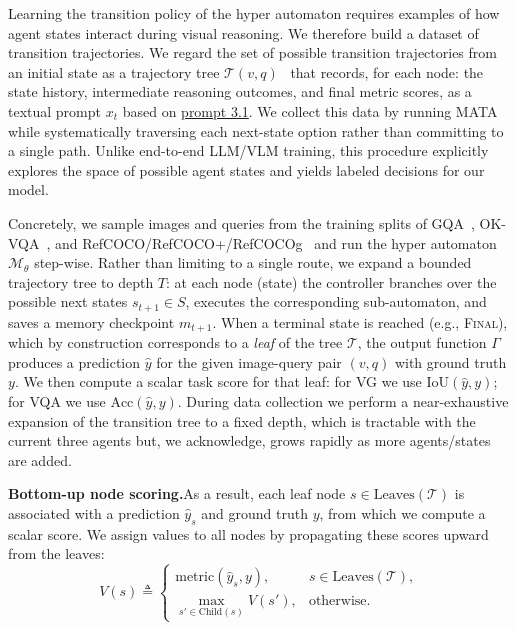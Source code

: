 \documentclass{article} %
\newcommand{\methodname}{MATA}
\begin{document}
Learning the transition policy of the hyper automaton requires examples of how agent states interact during visual reasoning. We therefore build a dataset of transition trajectories. We regard the set of possible transition trajectories from an initial state as a trajectory tree $\mathcal{T}(v,q)$~\citep{kearns_sparse_2002} that records, for each node: the state history, intermediate reasoning outcomes, and final metric scores, as a textual prompt $x_t$ based on \hyperref[prompt:hyper_agent]{prompt 3.1}. We collect this data by running \methodname{} while systematically traversing each next-state option rather than committing to a single path. Unlike end-to-end LLM/VLM training, this procedure explicitly explores the space of possible agent states and yields labeled decisions for our model.

Concretely, we sample images and queries from the training splits of GQA~\citep{hudson_gqa_2019}, OK-VQA~\citep{marino_ok-vqa_2019}, and RefCOCO/RefCOCO+/RefCOCOg~\citep{kazemzadeh_referitgame_2014} and run the hyper automaton $\mathcal{M}_\theta$ step-wise. Rather than limiting to a single route, we expand a bounded trajectory tree to depth $T$: at each node (state) the controller branches over the possible next states $s_{t+1}\in S$, executes the corresponding sub-automaton, and saves a memory checkpoint $m_{t+1}$. When a terminal state is reached (e.g., \textsc{Final}), which by construction corresponds to a \emph{leaf} of the tree $\mathcal{T}$, the output function $\Gamma$ produces a prediction $\hat y$ for the given image-query pair $(v,q)$ with ground truth $y$. We then compute a scalar task score for that leaf: for VG we use $\mathrm{IoU}(\hat y,y)$; for VQA we use $\mathrm{Acc}(\hat y,y)$. During data collection we perform a near-exhaustive expansion of the transition tree to a fixed depth, which is tractable with the current three agents but, we acknowledge, grows rapidly as more agents/states are added.

\textbf{Bottom-up node scoring.}\quad As a result, each leaf node $s \in \mathrm{Leaves}(\mathcal{T})$ is associated with a prediction $\hat y_s$ and ground truth $y$, from which we compute a scalar score. We assign values to all nodes by propagating these scores upward from the leaves:
\begin{equation}
V(s) \triangleq 
\begin{cases}
\mathrm{metric}(\hat y_{s}, y), & s \in \mathrm{Leaves}(\mathcal{T}),\\
\max_{s'\in \mathrm{Child}(s)} V(s'), & \text{otherwise.}
\end{cases}
\end{equation}
\end{document}
